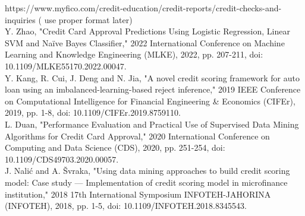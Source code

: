 \documentclass[12pt]{article}
\begin{document}
https://www.myfico.com/credit-education/credit-reports/credit-checks-and-inquiries ( use proper format later)\\
\noindent Y. Zhao, "Credit Card Approval Predictions Using Logistic Regression, Linear SVM and Naïve Bayes Classifier," 2022 International Conference on Machine Learning and Knowledge Engineering (MLKE), 2022, pp. 207-211, doi: 10.1109/MLKE55170.2022.00047.\\

\noindent Y. Kang, R. Cui, J. Deng and N. Jia, "A novel credit scoring framework for auto loan using an imbalanced-learning-based reject inference," 2019 IEEE Conference on Computational Intelligence for Financial Engineering \& Economics (CIFEr), 2019, pp. 1-8, doi: 10.1109/CIFEr.2019.8759110.\\

\noindent L. Duan, "Performance Evaluation and Practical Use of Supervised Data Mining Algorithms for Credit Card Approval," 2020 International Conference on Computing and Data Science (CDS), 2020, pp. 251-254, doi: 10.1109/CDS49703.2020.00057.\\

\noindent J. Nalić and A. Švraka, "Using data mining approaches to build credit scoring model: Case study — Implementation of credit scoring model in microfinance institution," 2018 17th International Symposium INFOTEH-JAHORINA (INFOTEH), 2018, pp. 1-5, doi: 10.1109/INFOTEH.2018.8345543.
\end{document}
